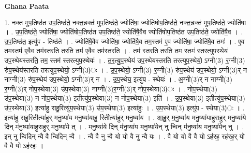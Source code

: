 \documentclass[17pt]{extarticle}
\begin{document}
\textbf{Ghana Paata } \newline

1. नक्त॑ मुप॒तिष्ठ॑त उप॒तिष्ठ॑ते॒ नक्त॒न्नक्त॑ मुप॒तिष्ठ॑ते॒ ज्योति॑षा॒ ज्योति॑षोप॒तिष्ठ॑ते॒ नक्त॒न्नक्त॑ मुप॒तिष्ठ॑ते॒ ज्योति॑षा । . उ॒प॒तिष्ठ॑ते॒ ज्योति॑षा॒ ज्योति॑षोप॒तिष्ठ॑त उप॒तिष्ठ॑ते॒ ज्योति॑षै॒वैव ज्योति॑षोप॒तिष्ठ॑त उप॒तिष्ठ॑ते॒ ज्योति॑षै॒व । . उ॒प॒तिष्ठ॑त॒ इत्यु॑प - तिष्ठ॑ते । . ज्योति॑षै॒वैव ज्योति॑षा॒ ज्योति॑षै॒व तम॒स्तम॑ ए॒व ज्योति॑षा॒ ज्योति॑षै॒व तमः॑ । . ए॒व तम॒स्तम॑ ए॒वैव तम॑स्तरति तरति॒ तम॑ ए॒वैव तम॑स्तरति । . तम॑ स्तरति तरति॒ तम॒ स्तम॑ स्तरत्युप॒स्थेय॑ उप॒स्थेय॑स्तरति॒ तम॒ स्तम॑ स्तरत्युप॒स्थेयः॑ । . त॒र॒त्यु॒प॒स्थेय॑ उप॒स्थेय॑स्तरति तरत्युप॒स्थेयो॒ ऽग्नी(3) र॒ग्नी(3) रु॑प॒स्थेय॑स्तरति तरत्युप॒स्थेयो॒ ऽग्नी(3)ः । . उ॒प॒स्थेयो॒ ऽग्नी(3) र॒ग्नी(3) रु॑प॒स्थेय॑ उप॒स्थेयो॒ ऽग्नी(3)र् न नाग्नी(3) रु॑प॒स्थेय॑ उप॒स्थेयो॒ ऽग्नी(3)र् न । . उ॒प॒स्थेय॒ इत्यु॑प - स्थेयः॑ । . अ॒ग्नी(3)र् न नाग्नी(3) र॒ग्नी(3)र् नोप॒स्थेया(3) उ॑प॒स्थेया(3) नाग्नी(3)र॒ग्नी(3)र् नोप॒स्थेया(3)ः । . नोप॒स्थेया(3) उ॑प॒स्थेया(3) न नोप॒स्थेया(3) इतीत्यु॑प॒स्थेया(3) न नोप॒स्थेया(3) इति॑ । . उ॒प॒स्थेया(3) इतीत्यु॑प॒स्थेया(3) उ॑प॒स्थेया(3) इत्या॑हु राहु॒रित्यु॑प॒स्थेया(3) उ॑प॒स्थेया(3) इत्या॑हुः । . उ॒प॒स्थेया(3) इत्यु॑प - स्थेया(3)ः । . इत्या॑हु राहु॒रितीत्या॑हुर् मनु॒ष्या॑य मनु॒ष्या॑याहु॒ रितीत्या॑हुर् मनु॒ष्या॑य । . आ॒हु॒र् म॒नु॒ष्या॑य मनु॒ष्या॑याहुराहुर् मनु॒ष्या॑ये दिन् म॑नु॒ष्या॑याहुराहुर् मनु॒ष्या॑ये त् । . म॒नु॒ष्या॑ये दिन् म॑नु॒ष्या॑य मनु॒ष्या॑येन् नु न्विन् म॑नु॒ष्या॑य मनु॒ष्या॑येन् नु । . इन् नु न्विदिन् न्वै वै न्विदिन् न्वै । . न्वै वै नु न्वै यो यो वै नु न्वै यः । . वै यो यो वै वै यो ऽह॑रह॒ रह॑रह॒र् यो वै वै यो ऽह॑रहः । \newline
\end{document}
